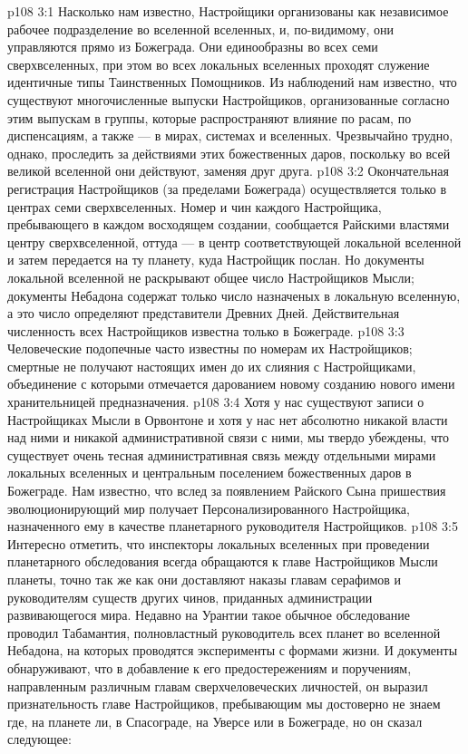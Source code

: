 \vs p108 3:1 Насколько нам известно, Настройщики организованы как независимое рабочее подразделение во вселенной вселенных, и, по\hyp{}видимому, они управляются прямо из Божеграда. Они единообразны во всех семи сверхвселенных, при этом во всех локальных вселенных проходят служение идентичные типы Таинственных Помощников. Из наблюдений нам известно, что существуют многочисленные выпуски Настройщиков, организованные согласно этим выпускам в группы, которые распространяют влияние по расам, по диспенсациям, а также --- в мирах, системах и вселенных. Чрезвычайно трудно, однако, проследить за действиями этих божественных даров, поскольку во всей великой вселенной они действуют, заменяя друг друга.
\vs p108 3:2 Окончательная регистрация Настройщиков (за пределами Божеграда) осуществляется только в центрах семи сверхвселенных. Номер и чин каждого Настройщика, пребывающего в каждом восходящем создании, сообщается Райскими властями центру сверхвселенной, оттуда --- в центр соответствующей локальной вселенной и затем передается на ту планету, куда Настройщик послан. Но документы локальной вселенной не раскрывают общее число Настройщиков Мысли; документы Небадона содержат только число назначеных в локальную вселенную, а это число определяют представители Древних Дней. Действительная численность всех Настройщиков известна только в Божеграде.
\vs p108 3:3 Человеческие подопечные часто известны по номерам их Настройщиков; смертные не получают настоящих имен до их слияния с Настройщиками, объединение с которыми отмечается дарованием новому созданию нового имени хранительницей предназначения.
\vs p108 3:4 Хотя у нас существуют записи о Настройщиках Мысли в Орвонтоне и хотя у нас нет абсолютно никакой власти над ними и никакой административной связи с ними, мы твердо убеждены, что существует очень тесная административная связь между отдельными мирами локальных вселенных и центральным поселением божественных даров в Божеграде. Нам известно, что вслед за появлением Райского Сына пришествия эволюционирующий мир получает Персонализированного Настройщика, назначенного ему в качестве планетарного руководителя Настройщиков.
\vs p108 3:5 \pc Интересно отметить, что инспекторы локальных вселенных при проведении планетарного обследования всегда обращаются к главе Настройщиков Мысли планеты, точно так же как они доставляют наказы главам серафимов и руководителям существ других чинов, приданных администрации развивающегося мира. Недавно на Урантии такое обычное обследование проводил Табамантия, полновластный руководитель всех планет во вселенной Небадона, на которых проводятся эксперименты с формами жизни. И документы обнаруживают, что в добавление к его предостережениям и поручениям, направленным различным главам сверхчеловеческих личностей, он выразил признательность главе Настройщиков, пребывающим мы достоверно не знаем где, на планете ли, в Спасограде, на Уверсе или в Божеграде, но он сказал следующее:
